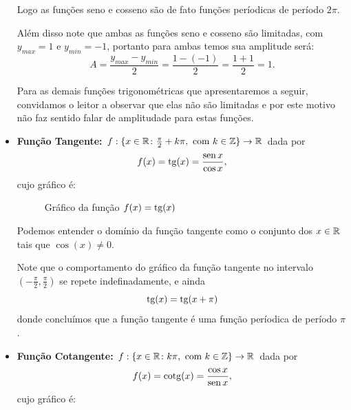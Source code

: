 \begin{itemize}
  Logo as funções seno e cosseno são de fato funções períodicas de período $2\pi$.
  
  Além disso note que ambas as funções seno e cosseno são limitadas, com $y_{max}= 1$ e $y_{min}= -1$, portanto para ambas temos sua amplitude será:
  \begin{equation*}
  A= \frac{y_{max} - y_{min}}{2}= \frac{1 - (-1)}{2}= \frac{1+1}{2}= 1.
  \end{equation*}
  
  Para as demais funções trigonométricas que apresentaremos a seguir, convidamos o leitor a observar que elas não são limitadas e por este motivo não faz sentido falar de amplitudade para estas funções.

  \item \textbf{Função Tangente:} $f: \{x\in\mathbb{R} \colon \frac{\pi}{2} +k\pi, \mbox{ com } k \in \mathbb{Z}\} \rightarrow \mathbb{R}$ dada por
  \begin{equation*}
      f(x)= \operatorname{tg}(x) = \frac{\operatorname{sen} x}{\cos x},
  \end{equation*}
    cujo gráfico é:

  \begin{figure}[H]
  \centering
    \caption{Gráfico da função $f(x)= \operatorname{tg} (x)$}
  \end{figure}

  Podemos entender o domínio da função tangente como o conjunto dos $x \in \mathbb{R}$ tais que $\cos(x) \neq 0$.

  Note que o comportamento do gráfico da função tangente no intervalo $(-\frac{\pi}{2}, \frac{\pi}{2})$ se repete indefinadamente, e ainda
\begin{equation*}
\operatorname{tg}(x)= \operatorname{tg}(x + \pi)
\end{equation*}
  donde concluímos que a função tangente é uma função períodica de período $\pi$.

    \item \textbf{Função Cotangente:} $f: \{x\in\mathbb{R} \colon k\pi, \mbox{ com } k \in \mathbb{Z}\} \rightarrow \mathbb{R}$ dada por 
    \begin{equation*}
    f(x)= \operatorname{cotg}(x) = \frac{\cos x}{\operatorname{sen} x},
    \end{equation*}
    cujo gráfico é:


\end{itemize}
